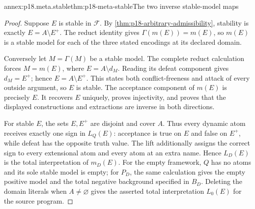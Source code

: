 \begin{annexitem}{annex:p18.meta.stable}{thm:p18-meta-stable}{The two inverse stable-model maps}
\begin{proof}
Suppose \(E\) is stable in \(\mathcal F\).
By \cref{thm:p18-arbitrary-admissibility}, stability is
exactly \(E=A\setminus E^+\). The reduct identity gives
\(\Gamma(m(E))=m(E)\), so \(m(E)\) is a stable model
for each of the three stated encodings at its declared domain.

Conversely let \(M=\Gamma(M)\) be a stable model.
The complete reduct calculation forces \(M=m(E)\),
where \(E=A\setminus d_M\). Reading its defeat component
gives \(d_M=E^+\); hence \(E=A\setminus E^+\).
This states both conflict-freeness and attack of every
outside argument, so \(E\) is stable.
The acceptance component of \(m(E)\) is precisely \(E\).
It recovers \(E\) uniquely, proves injectivity, and proves
that the displayed constructions and extractions are
inverse in both directions.

For stable \(E\), the sets \(E,E^+\) are disjoint and
cover \(A\). Thus every dynamic atom receives exactly
one sign in \(L_Q(E)\): acceptance is true on \(E\)
and false on \(E^+\), while defeat has the opposite
truth value. The lift additionally assigns the correct
sign to every extensional atom and every atom at an
extra name. Hence \(L_D(E)\) is the total interpretation
of \(m_D(E)\). For the empty framework, \(Q\) has no
atoms and its sole stable model is empty; for \(P_D\),
the same calculation gives the empty positive model
and the total negative background specified in \(B_D\).
Deleting the domain literals when \(A\ne\varnothing\)
gives the asserted total interpretation \(L_0(E)\)
for the source program.
\end{proof}
\end{annexitem}

